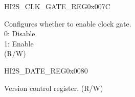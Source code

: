 \begin{register}{H}{I2S\_CLK\_GATE\_REG}{0x007C}\label{regdesc:I2SCLKGATEREG}
%
%
\regnewline%
\begin{regdesc}\begin{reglist}
\label{fielddesc:I2SCLKEN}\item [I2S\_CLK\_EN] Configures whether to enable clock gate. \\
0: Disable\\
1: Enable\\
(R/W)
\end{reglist}\end{regdesc}
\end{register}


\begin{register}{H}{I2S\_DATE\_REG}{0x0080}\label{regdesc:I2SDATEREG}
%
%
\regnewline%
\begin{regdesc}\begin{reglist}
\label{fielddesc:I2SDATE}\item [I2S\_DATE] Version control register. (R/W)
\end{reglist}\end{regdesc}
\end{register}
